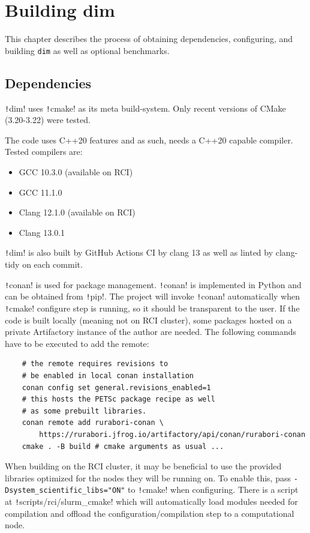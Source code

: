 \documentclass[thesis=M,english]{FITthesis}[2019/12/23]
\newcommand{\csre}[1]{\texttt!#1!}
\begin{document}
\chapter{Building dim}

This chapter describes the process of obtaining dependencies, configuring, and building \texttt{dim} as well
as optional benchmarks.

\section{Dependencies}\label{bdim:deps}

\csre{dim} uses \csre{cmake} as its meta build-system. Only recent versions of CMake (3.20-3.22) were tested.

The code uses C++20 features and as such, needs a C++20 capable compiler. Tested compilers
are:

\begin{itemize}
    \item GCC 10.3.0 (available on RCI)
    \item GCC 11.1.0
    \item Clang 12.1.0 (available on RCI)
    \item Clang 13.0.1
\end{itemize}
\csre{dim} is also built by GitHub Actions CI by clang 13 as well as linted by clang-tidy on each commit.

\csre{conan} is used for package management. \csre{conan} is implemented in Python and can be
obtained from \csre{pip}. The project will invoke \csre{conan} automatically when \csre{cmake} configure step
is running, so it should be transparent to the user. If the code is built locally (meaning not on RCI cluster),
some packages hosted on a private Artifactory instance of the author are needed. The following commands
have to be executed to add the remote:

\begin{verbatim}
    # the remote requires revisions to 
    # be enabled in local conan installation
    conan config set general.revisions_enabled=1
    # this hosts the PETSc package recipe as well
    # as some prebuilt libraries.
    conan remote add rurabori-conan \
        https://rurabori.jfrog.io/artifactory/api/conan/rurabori-conan
    cmake . -B build # cmake arguments as usual ...
\end{verbatim}

When building on the RCI cluster, it may be beneficial
to use the provided libraries optimized for the nodes they will be running on. To enable this,
pass \texttt{-Dsystem_scientific_libs="ON"} to \csre{cmake} when configuring. There is a script
at \csre{scripts/rci/slurm_cmake} which will automatically load modules needed for compilation and offload
the configuration/compilation step to a computational node.
\end{document}
